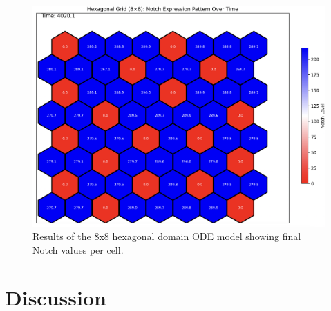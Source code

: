 \documentclass{article}
\begin{document}
\begin{flushleft}
\begin{figure}
  \includegraphics[width=\textwidth]{img/ODE_HexGrid.png}
  \caption{Results of the 8x8 hexagonal domain ODE model showing final Notch values per cell.}
\end{figure}

\section{Discussion}

\end{flushleft}

\nocite{*}
\printbibliography
\end{document}
